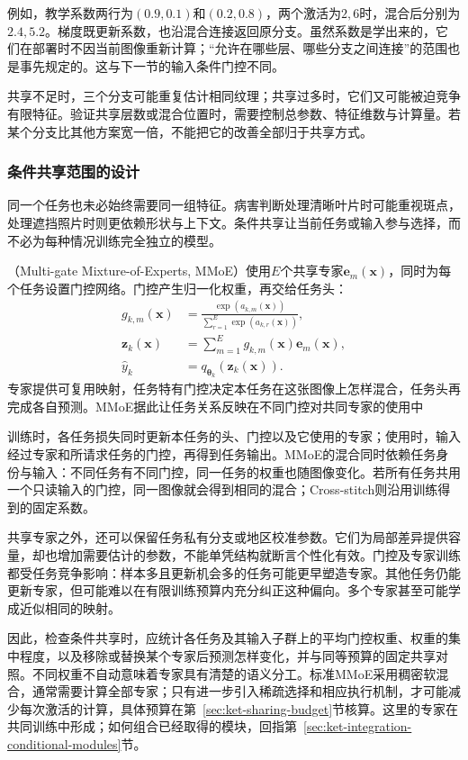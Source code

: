 例如，教学系数两行为$(0.9,0.1)$和$(0.2,0.8)$，两个激活为$2,6$时，混合后分别为$2.4,5.2$。梯度既更新系数，也沿混合连接返回原分支。虽然系数是学出来的，它们在部署时不因当前图像重新计算；“允许在哪些层、哪些分支之间连接”的范围也是事先规定的。这与下一节的输入条件门控不同。

共享不足时，三个分支可能重复估计相同纹理；共享过多时，它们又可能被迫竞争有限特征。验证共享层数或混合位置时，需要控制总参数、特征维数与计算量。若某个分支比其他方案宽一倍，不能把它的改善全部归于共享方式。

\subsubsection{条件共享范围的设计}
\label{sec:ket-sharing-conditional}

同一个任务也未必始终需要同一组特征。病害判断处理清晰叶片时可能重视斑点，处理遮挡照片时则更依赖形状与上下文。条件共享让当前任务或输入参与选择，而不必为每种情况训练完全独立的模型。

（Multi-gate Mixture-of-Experts, MMoE）使用$E$个共享专家$\bm e_m(\bm x)$，同时为每个任务设置门控网络。门控产生归一化权重，再交给任务头：
\begin{align}
  g_{k,m}(\bm x)
    &=\frac{\exp(a_{k,m}(\bm x))}
      {\sum_{r=1}^{E}\exp(a_{k,r}(\bm x))},
  \\
  \bm z_k(\bm x)
    &=\sum_{m=1}^{E}g_{k,m}(\bm x)\bm e_m(\bm x),
  \nonumber\\
  \hat y_k&=q_{\bm{\theta}_k}(\bm z_k(\bm x)).
  \label{eq:ket-sharing-mmoe}
\end{align}
专家提供可复用映射，任务特有门控决定本任务在这张图像上怎样混合，任务头再完成各自预测。MMoE据此让任务关系反映在不同门控对共同专家的使用中

训练时，各任务损失同时更新本任务的头、门控以及它使用的专家；使用时，输入经过专家和所请求任务的门控，再得到任务输出。MMoE的混合同时依赖任务身份与输入：不同任务有不同门控，同一任务的权重也随图像变化。若所有任务共用一个只读输入的门控，同一图像就会得到相同的混合；Cross-stitch则沿用训练得到的固定系数。

共享专家之外，还可以保留任务私有分支或地区校准参数。它们为局部差异提供容量，却也增加需要估计的参数，不能单凭结构就断言个性化有效。门控及专家训练都受任务竞争影响：样本多且更新机会多的任务可能更早塑造专家。其他任务仍能更新专家，但可能难以在有限训练预算内充分纠正这种偏向。多个专家甚至可能学成近似相同的映射。

因此，检查条件共享时，应统计各任务及其输入子群上的平均门控权重、权重的集中程度，以及移除或替换某个专家后预测怎样变化，并与同等预算的固定共享对照。不同权重不自动意味着专家具有清楚的语义分工。标准MMoE采用稠密软混合，通常需要计算全部专家；只有进一步引入稀疏选择和相应执行机制，才可能减少每次激活的计算，具体预算在第~\ref{sec:ket-sharing-budget}节核算。这里的专家在共同训练中形成；如何组合已经取得的模块，回指第~\ref{sec:ket-integration-conditional-modules}节。

